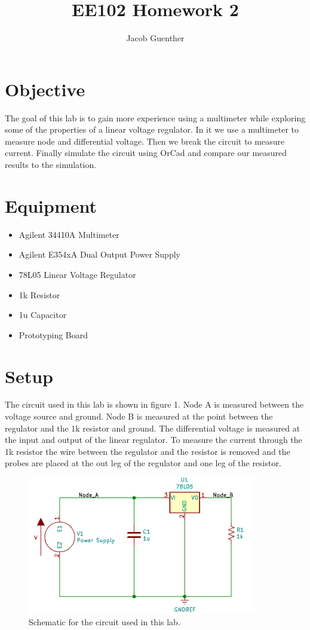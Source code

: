 \documentclass{article}
\title{EE102 Homework 2}
\author{Jacob Guenther}
\begin{document}


\section{Objective}
The goal of this lab is to gain more experience using a multimeter while exploring some of the properties of a linear voltage regulator. In it we use a multimeter to measure node and differential voltage. Then we break the circuit to measure current. Finally simulate the circuit using OrCad and compare our measured results to the simulation.

\section{Equipment}
\begin{itemize}
	\item Agilent 34410A Multimeter
	\item Agilent E354xA Dual Output Power Supply
	\item 78L05 Linear Voltage Regulator
	\item 1k Resistor
	\item 1u Capacitor
	\item Prototyping Board
\end{itemize}

\section{Setup}
The circuit used in this lab is shown in figure 1. Node A is measured between the voltage source and ground. Node B is measured at the point between the regulator and the 1k resistor and ground. The differential voltage is measured at the input and output of the linear regulator. To measure the current through the 1k resistor the wire between the regulator and the resistor is removed and the probes are placed at the out leg of the regulator and one leg of the resistor.

\begin{figure}[H]
	\begin{center}
		\includegraphics[width=10cm]{lab2schematic.png}
	\end{center}
	\caption{Schematic for the circuit used in this lab.}
\end{figure}
\end{document}
